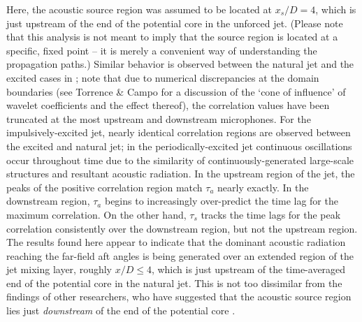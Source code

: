 Here, the acoustic source region was assumed to be located at $x_s /D = 4$, which is just upstream of the end of the potential core in the unforced jet. 
(Please note that this analysis is not meant to imply that the source region is located at a specific, fixed point – it is merely a convenient way of understanding the propagation paths.)
Similar behavior is observed between the natural jet and the excited cases in ; note that due to numerical discrepancies at the domain boundaries (see Torrence \& Campo \citep{Torrence1998} for a discussion of the `cone of influence' of wavelet coefficients and the effect thereof), the correlation values have been truncated at the most upstream and downstream microphones.
For the impulsively-excited jet, nearly identical correlation regions are observed between the excited and natural jet; in the periodically-excited jet continuous oscillations occur throughout time due to the similarity of continuously-generated large-scale structures and resultant acoustic radiation.
In the upstream region of the jet, the peaks of the positive correlation region match $\tau_a$ nearly exactly. 
In the downstream region, $\tau_a$ begins to increasingly over-predict the time lag for the maximum correlation. 
On the other hand, $\tau_s$ tracks the time lags for the peak correlation consistently over the downstream region, but not the upstream region. 
The results found here appear to indicate that the dominant acoustic radiation reaching the far-field aft angles is being generated over an extended region of the jet mixing layer, roughly $x/D \leq 4$, which is just upstream of the time-averaged end of the potential core in the natural jet.
This is not too dissimilar from the findings of other researchers, who have suggested that the acoustic source region lies just \textit{downstream} of the end of the potential core \citep{Hileman2005}.
